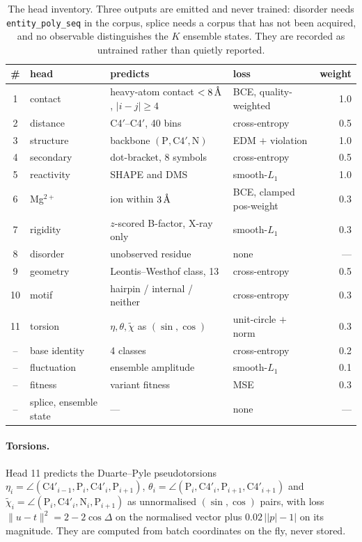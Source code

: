 \documentclass[11pt,a4paper]{article}
\begin{document}
\begin{table}[H]\centering\small
\begin{tabular}{clllr}
\toprule
\# & head & predicts & loss & weight \\
\midrule
1  & contact   & heavy-atom contact $<8\,\text{\AA}$, $|i-j|\ge4$ & BCE, quality-weighted & 1.0 \\
2  & distance  & C4$'$--C4$'$, 40 bins & cross-entropy & 0.5 \\
3  & structure & backbone $(\mathrm{P},\mathrm{C4}',\mathrm{N})$ & EDM $+$ violation & 1.0 \\
4  & secondary & dot-bracket, 8 symbols & cross-entropy & 0.5 \\
5  & reactivity& SHAPE and DMS & smooth-$L_1$ & 1.0 \\
6  & Mg$^{2+}$ & ion within $3\,\text{\AA}$ & BCE, clamped pos-weight & 0.3 \\
7  & rigidity  & $z$-scored B-factor, X-ray only & smooth-$L_1$ & 0.3 \\
8  & disorder  & unobserved residue & \textcolor{newred}{none} & --- \\
9  & geometry  & Leontis--Westhof class, 13 & cross-entropy & 0.5 \\
10 & motif     & hairpin / internal / neither & cross-entropy & 0.3 \\
11 & torsion   & $\eta,\theta,\tilde\chi$ as $(\sin,\cos)$ & unit-circle $+$ norm & 0.3 \\
\midrule
-- & base identity & 4 classes & cross-entropy & 0.2 \\
-- & fluctuation   & ensemble amplitude & smooth-$L_1$ & 0.1 \\
-- & fitness       & variant fitness & MSE & 0.3 \\
-- & splice, ensemble state & --- & \textcolor{newred}{none} & --- \\
\bottomrule
\end{tabular}
\caption{The head inventory. Three outputs are emitted and never trained:
disorder needs \texttt{entity\_poly\_seq} in the corpus, splice needs a
corpus that has not been acquired, and no observable distinguishes the
$K$ ensemble states. They are recorded as untrained rather than quietly
reported.}
\end{table}

\paragraph{Torsions.} Head 11 predicts the Duarte--Pyle pseudotorsions
$\eta_i = \angle(\mathrm{C4}'_{i-1},\mathrm{P}_i,\mathrm{C4}'_i,\mathrm{P}_{i+1})$,
$\theta_i = \angle(\mathrm{P}_i,\mathrm{C4}'_i,\mathrm{P}_{i+1},\mathrm{C4}'_{i+1})$
and
$\tilde\chi_i = \angle(\mathrm{P}_i,\mathrm{C4}'_i,\mathrm{N}_i,\mathrm{P}_{i+1})$
as unnormalised $(\sin,\cos)$ pairs, with loss
$\lVert u - t\rVert^2 = 2 - 2\cos\Delta$ on the normalised vector plus
$0.02\,\big||p| - 1\big|$ on its magnitude. They are computed from batch
coordinates on the fly, never stored.
\end{document}
